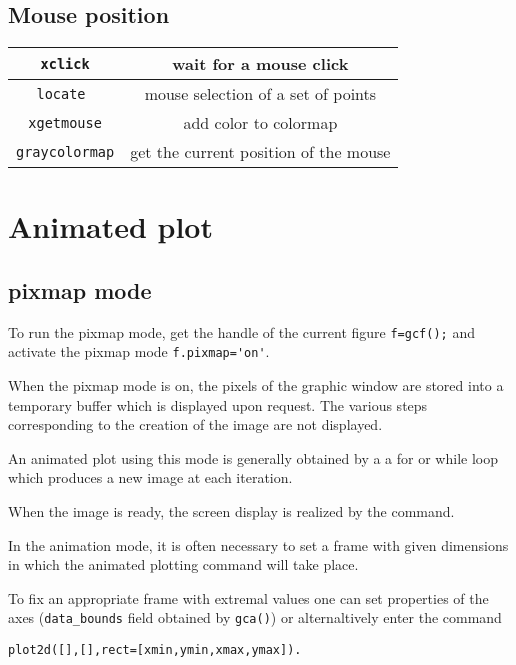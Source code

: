 \subsection{Mouse position}
\begin{center}
\begin{tabular}{|c|c|}
\hline
{\tt xclick} & wait for a mouse click \\ \hline
{\tt locate } & mouse selection of a set of points \\ \hline
{\tt xgetmouse} & add color to colormap \\ \hline
{\tt graycolormap} & get the current position of the mouse\\ \hline
\end{tabular}
\end{center}

\section{Animated plot}\label{Animation}
\subsection{pixmap mode}
To run the pixmap mode, get the handle of the current figure
\verb!f=gcf();! and activate the pixmap mode \verb!f.pixmap='on'!.

When the pixmap mode is on, the pixels of the graphic window
are stored into a temporary buffer which is displayed upon request.
The various steps corresponding to the creation of the image are not
displayed. 

An animated plot using this mode is generally obtained by a 
a for or while loop which produces a new image at each iteration.

When the image is ready, the screen display is realized by
the  command.

In the animation mode, it is often necessary to set a frame 
with given dimensions in which the animated plotting command will take place.

To fix an appropriate frame with extremal values 
 one can set properties of the axes
(\verb!data_bounds! field obtained by \verb!gca()!) or alternaltively 
enter the command 
\noindent
\begin{verbatim}
plot2d([],[],rect=[xmin,ymin,xmax,ymax]). 
\end{verbatim}


